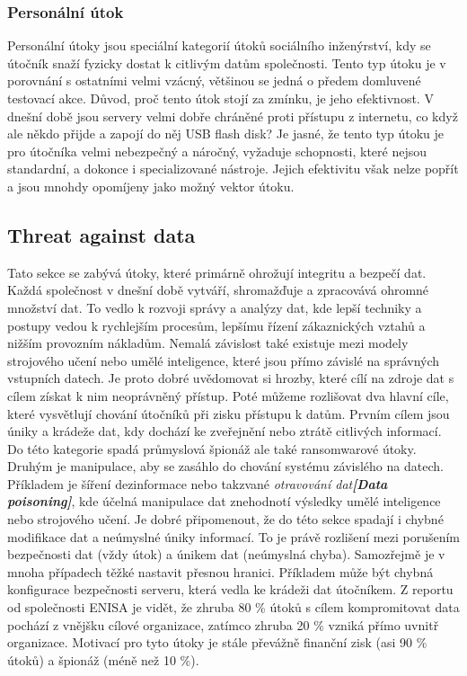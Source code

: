 \subsubsection{Personální útok}
Personální útoky jsou speciální kategorií útoků sociálního inženýrství, kdy se útočník snaží fyzicky dostat k citlivým datům společnosti.
Tento typ útoku je v porovnání s ostatními velmi vzácný, většinou se jedná o předem domluvené testovací akce.
Důvod, proč tento útok stojí za zmínku, je jeho efektivnost.
V dnešní době jsou servery velmi dobře chráněné proti přístupu z internetu, co když ale někdo přijde a zapojí do něj \ac{USB} flash disk?
Je jasné, že tento typ útoku je pro útočníka velmi nebezpečný a náročný, vyžaduje schopnosti, které nejsou standardní, a dokonce i specializované nástroje.
Jejich efektivitu však nelze popřít a jsou mnohdy opomíjeny jako možný vektor útoku.\cite{moje_bakalarka}


\subsection{Threat against data}\label{subsec:threat-against-data}
Tato sekce se zabývá útoky, které primárně ohrožují integritu a bezpečí dat.
Každá společnost v dnešní době vytváří, shromažďuje a zpracovává ohromné množství dat.
To vedlo k rozvoji správy a analýzy dat, kde lepší techniky a postupy vedou k rychlejším procesům, lepšímu řízení zákaznických vztahů a nižším provozním nákladům.
Nemalá závislost také existuje mezi modely strojového učení nebo umělé inteligence, které jsou přímo závislé na správných vstupních datech.
Je proto dobré uvědomovat si hrozby, které cílí na zdroje dat s cílem získat k nim neoprávněný přístup.
Poté můžeme rozlišovat dva hlavní cíle, které vysvětlují chování útočníků při zisku přístupu k datům.
Prvním cílem jsou úniky a krádeže dat, kdy dochází ke zveřejnění nebo ztrátě citlivých informací.
Do této kategorie spadá průmyslová špionáž ale také ransomwarové útoky.
Druhým je manipulace, aby se zasáhlo do chování systému závislého na datech.
Příkladem je šíření dezinformace nebo takzvané \textit{otravování dat\textbf{[Data poisoning]}}, kde účelná manipulace dat znehodnotí výsledky umělé inteligence nebo strojového učení.
Je dobré připomenout, že do této sekce spadají i chybné modifikace dat a neúmyslné úniky informací.
To je právě rozlišení mezi porušením bezpečnosti dat (vždy útok) a únikem dat (neúmyslná chyba).
Samozřejmě je v mnoha případech těžké nastavit přesnou hranici.
Příkladem může být chybná konfigurace bezpečnosti serveru, která vedla ke krádeži dat útočníkem.
Z reportu od společnosti \ac{ENISA} je vidět, že zhruba 80 \% útoků s cílem kompromitovat data pochází z vnějšku cílové organizace, zatímco zhruba 20 \% vzniká přímo uvnitř organizace.
Motivací pro tyto útoky je stále převážně finanční zisk (asi 90 \% útoků) a špionáž (méně než 10 \%).\cite{Enisa_thread_landscape}

